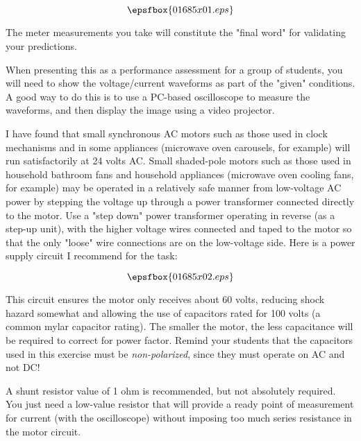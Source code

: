 

$$\epsfbox{01685x01.eps}$$

\vfil \eject






The meter measurements you take will constitute the "final word" for validating your predictions.







When presenting this as a performance assessment for a group of students, you will need to show the voltage/current waveforms as part of the "given" conditions.  A good way to do this is to use a PC-based oscilloscope to measure the waveforms, and then display the image using a video projector.

I have found that small synchronous AC motors such as those used in clock mechanisms and in some appliances (microwave oven carousels, for example) will run satisfactorily at 24 volts AC.  Small shaded-pole motors such as those used in household bathroom fans and household appliances (microwave oven cooling fans, for example) may be operated in a relatively safe manner from low-voltage AC power by stepping the voltage up through a power transformer connected directly to the motor.  Use a "step down" power transformer operating in reverse (as a step-up unit), with the higher voltage wires connected and taped to the motor so that the only "loose" wire connections are on the low-voltage side.  Here is a power supply circuit I recommend for the task:

$$\epsfbox{01685x02.eps}$$

This circuit ensures the motor only receives about 60 volts, reducing shock hazard somewhat and allowing the use of capacitors rated for 100 volts (a common mylar capacitor rating).  The smaller the motor, the less capacitance will be required to correct for power factor.  Remind your students that the capacitors used in this exercise must be {\it non-polarized}, since they must operate on AC and not DC!

A shunt resistor value of 1 ohm is recommended, but not absolutely required.  You just need a low-value resistor that will provide a ready point of measurement for current (with the oscilloscope) without imposing too much series resistance in the motor circuit.




